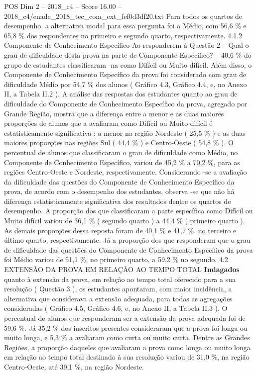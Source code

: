 \begin{textsample}{POS Dim 2 – 2018\_c4 – Score 16.00 – 2018\_c4/enade\_2018\_tec\_com\_ext\_fef0d3df20.txt}
Para todos os quartos de desempenho, a alternativa modal para essa pergunta foi a Médio, com 56,6 \% e 65,8 \% dos respondentes no primeiro e segundo quarto, respectivamente. 4.1.2 Componente de Conhecimento Específico Ao responderem à Questão 2 – Qual o grau de dificuldade desta prova na parte de Componente Específico? – 40,6 \% do grupo de estudantes classificaram -na como Difícil ou Muito difícil.
Além disso, o Componente de Conhecimento Específico da prova foi considerado com grau de dificuldade Médio por 54,7 \% dos alunos ( Gráfico 4.3, Gráfico 4.4, e, no Anexo II, a Tabela II.2 ).
A análise das respostas dos estudantes quanto ao grau de dificuldade do Componente de Conhecimento Específico da prova, agregado por Grande Região, mostra que a diferença entre a menor e as duas maiores proporções de alunos que a avaliaram como Difícil ou Muito difícil é estatisticamente significativa : a menor na região Nordeste ( 25,5 \% ) e as duas maiores proporções nas regiões Sul ( 44,4 \% ) e Centro-Oeste ( 54,8 \% ).
O percentual de alunos que classificaram o grau de dificuldade como Médio, no Componente de Conhecimento Específico, variou de 45,2 \% a 70,2 \%, para as regiões Centro-Oeste e Nordeste, respectivamente.
Considerando -se a avaliação da dificuldade das questões do Componente de Conhecimento Específico da prova, de acordo com o desempenho dos estudantes, observa -se que não há diferença estatisticamente significativa dos resultados dentre os quartos de desempenho.
A proporção dos que classificaram a parte específica como Difícil ou Muito difícil variou de 36,1 \% ( segundo quarto ) a 44,4 \% ( primeiro quarto ).
As demais proporções dessa reposta foram de 40,1 \% e 41,7 \%, no terceiro e último quarto, respectivamente.
Já a proporção dos que responderam que o grau de dificuldade das questões do Componente de Conhecimento Específico da prova foi Médio variou de 51,1 \%, no primeiro quarto, a 59,2 \% no segundo. 4.2 EXTENSÃO DA PROVA EM RELAÇÃO AO TEMPO TOTAL \textbf{Indagados} quanto à extensão da prova, em relação ao tempo total oferecido para a sua resolução ( Questão 3 ), os estudantes apontaram, com maior incidência, a alternativa que considerava a extensão adequada, para todas as agregações consideradas ( Gráfico 4.5, Gráfico 4.6, e, no Anexo II, a Tabela II.3 ).
O percentual de alunos que responderam ser a extensão da prova adequada foi de 59,6 \%.
Já 35,2 \% dos inscritos presentes consideraram que a prova foi longa ou muito longa, e 5,3 \% a avaliaram como curta ou muito curta.
Dentre as Grandes Regiões, a proporção daqueles que avaliaram a prova como longa ou muito longa em relação ao tempo total destinado à sua resolução variou de 31,0 \%, na região Centro-Oeste, até 39,1 \%, na região Nordeste.

\end{textsample}
